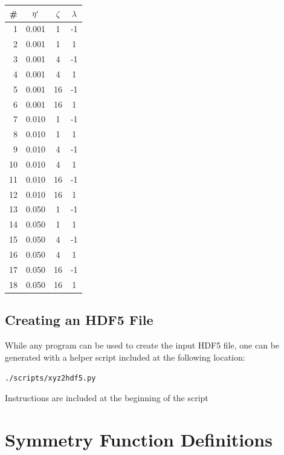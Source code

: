 \documentclass{article}
\begin{document}
\begin{multicols}{3}
\begin{tabular}{| r | c | c | c |}
\hline
\# & $\eta`$ & $\zeta$ & $\lambda$ \\  \hline
 1  &  0.001  &   1  &  -1 \\
 2  &  0.001  &   1  &   1 \\
 3  &  0.001  &   4  &  -1 \\
 4  &  0.001  &   4  &   1 \\
 5  &  0.001  &  16  &  -1 \\
 6  &  0.001  &  16  &   1 \\
 7  &  0.010  &   1  &  -1 \\
 8  &  0.010  &   1  &   1 \\
 9  &  0.010  &   4  &  -1 \\
10  &  0.010  &   4  &   1 \\
11  &  0.010  &  16  &  -1 \\
12  &  0.010  &  16  &   1 \\
13  &  0.050  &   1  &  -1 \\
14  &  0.050  &   1  &   1 \\
15  &  0.050  &   4  &  -1 \\
16  &  0.050  &   4  &   1 \\
17  &  0.050  &  16  &  -1 \\
18  &  0.050  &  16  &   1 \\
\hline 
\end{tabular}
\end{multicols}

\subsection{Creating an HDF5 File}
While any program can be used to create the input HDF5 file, one can be generated with a helper script included at the following location:

 \texttt{./scripts/xyz2hdf5.py}
 
 Instructions are included at the beginning of the script
 
\section{Symmetry Function Definitions}
\end{document}
